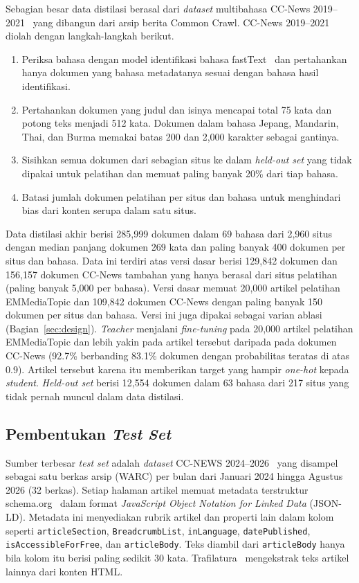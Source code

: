 \documentclass{ieeeaccess}
\newcommand{\en}[1]{\textit{#1}}
\begin{document}
Sebagian besar data distilasi berasal dari \en{dataset} multibahasa CC-News 2019--2021~\cite{cloversearch_ccnews} yang dibangun dari arsip berita Common Crawl. CC-News 2019--2021 diolah dengan langkah-langkah berikut.
\begin{enumerate}
  \item Periksa bahasa dengan model identifikasi bahasa fastText~\cite{joulin2017bag} dan pertahankan hanya dokumen yang bahasa metadatanya sesuai dengan bahasa hasil identifikasi.
  \item Pertahankan dokumen yang judul dan isinya mencapai total 75 kata dan potong teks menjadi 512 kata. Dokumen dalam bahasa Jepang, Mandarin, Thai, dan Burma memakai batas 200 dan 2,000 karakter sebagai gantinya.
  \item Sisihkan semua dokumen dari sebagian situs ke dalam \en{held-out set} yang tidak dipakai untuk pelatihan dan memuat paling banyak 20\% dari tiap bahasa.
  \item Batasi jumlah dokumen pelatihan per situs dan bahasa untuk menghindari bias dari konten serupa dalam satu situs.
\end{enumerate}
Data distilasi akhir berisi 285,999 dokumen dalam 69 bahasa dari 2,960 situs dengan median panjang dokumen 269 kata dan paling banyak 400 dokumen per situs dan bahasa. Data ini terdiri atas versi dasar berisi 129,842 dokumen dan 156,157 dokumen CC-News tambahan yang hanya berasal dari situs pelatihan (paling banyak 5,000 per bahasa). Versi dasar memuat 20,000 artikel pelatihan EMMediaTopic dan 109,842 dokumen CC-News dengan paling banyak 150 dokumen per situs dan bahasa. Versi ini juga dipakai sebagai varian ablasi (Bagian~\ref{sec:design}). \en{Teacher} menjalani \en{fine-tuning} pada 20,000 artikel pelatihan EMMediaTopic dan lebih yakin pada artikel tersebut daripada pada dokumen CC-News (92.7\% berbanding 83.1\% dokumen dengan probabilitas teratas di atas 0.9). Artikel tersebut karena itu memberikan target yang hampir \en{one-hot} kepada \en{student}. \en{Held-out set} berisi 12,554 dokumen dalam 63 bahasa dari 217 situs yang tidak pernah muncul dalam data distilasi.

\subsection{Pembentukan \en{Test Set}}
\label{sec:testset}
Sumber terbesar \en{test set} adalah \en{dataset} CC-NEWS 2024--2026~\cite{commoncrawl2026ccnews} yang disampel sebagai satu berkas arsip (WARC) per bulan dari Januari 2024 hingga Agustus 2026 (32 berkas). Setiap halaman artikel memuat metadata terstruktur schema.org~\cite{guha2016schema} dalam format \en{JavaScript Object Notation for Linked Data} (JSON-LD). Metadata ini menyediakan rubrik artikel dan properti lain dalam kolom seperti \texttt{articleSection}, \texttt{BreadcrumbList}, \texttt{inLanguage}, \texttt{datePublished}, \texttt{isAccessibleForFree}, dan \texttt{articleBody}. Teks diambil dari \texttt{articleBody} hanya bila kolom itu berisi paling sedikit 30 kata. Trafilatura~\cite{barbaresi2021trafilatura} mengekstrak teks artikel lainnya dari konten HTML.
\end{document}
